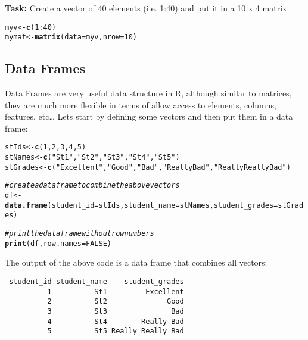 \documentclass{article}\usepackage[]{graphicx}\usepackage[]{color}
\makeatletter
\newcommand{\hlnum}[1]{\textcolor[rgb]{0.686,0.059,0.569}{#1}}%
\newcommand{\hlstr}[1]{\textcolor[rgb]{0.192,0.494,0.8}{#1}}%
\newcommand{\hlcom}[1]{\textcolor[rgb]{0.678,0.584,0.686}{\textit{#1}}}%
\newcommand{\hlopt}[1]{\textcolor[rgb]{0,0,0}{#1}}%
\newcommand{\hlstd}[1]{\textcolor[rgb]{0.345,0.345,0.345}{#1}}%
\newcommand{\hlkwb}[1]{\textcolor[rgb]{0.69,0.353,0.396}{#1}}%
\newcommand{\hlkwc}[1]{\textcolor[rgb]{0.333,0.667,0.333}{#1}}%
\newcommand{\hlkwd}[1]{\textcolor[rgb]{0.737,0.353,0.396}{\textbf{#1}}}%
\newenvironment{kframe}{%
 \def\at@end@of@kframe{}%
 \ifinner\ifhmode%
  \def\at@end@of@kframe{\end{minipage}}%
  \begin{minipage}{\columnwidth}%
 \fi\fi%
 \def\FrameCommand##1{\hskip\@totalleftmargin \hskip-\fboxsep
 \colorbox{shadecolor}{##1}\hskip-\fboxsep
     \hskip-\linewidth \hskip-\@totalleftmargin \hskip\columnwidth}%
 \MakeFramed {\advance\hsize-\width
   \@totalleftmargin\z@ \linewidth\hsize
   \@setminipage}}%
 {\par\unskip\endMakeFramed%
 \at@end@of@kframe}
\newenvironment{knitrout}{}{} %
\makeatother
\begin{document}
\textbf{Task:} Create a vector of 40 elements (i.e. 1:40) and put it in a 10 x 4 matrix
\begin{knitrout}
\color{fgcolor}\begin{kframe}
\begin{alltt}
\hlstd{myv} \hlkwb{<-} \hlkwd{c}\hlstd{(}\hlnum{1}\hlopt{:}\hlnum{40}\hlstd{)}
\hlstd{mymat} \hlkwb{<-} \hlkwd{matrix}\hlstd{(}\hlkwc{data}\hlstd{=myv,} \hlkwc{nrow}\hlstd{=}\hlnum{10}\hlstd{)}
\end{alltt}
\end{kframe}
\end{knitrout}

\subsection{Data Frames}

Data Frames are very useful data structure in R, although similar to matrices, they are much more flexible in terms of allow access to elements, columns, features, etc… Lets start by defining some vectors and then put them in a data frame: 

\begin{knitrout}
\color{fgcolor}\begin{kframe}
\begin{alltt}
\hlstd{stIds} \hlkwb{<-} \hlkwd{c}\hlstd{(}\hlnum{1}\hlstd{,}\hlnum{2}\hlstd{,}\hlnum{3}\hlstd{,}\hlnum{4}\hlstd{,}\hlnum{5}\hlstd{)}
\hlstd{stNames}\hlkwb{<-} \hlkwd{c}\hlstd{(}\hlstr{"St1"}\hlstd{,}\hlstr{"St2"}\hlstd{,}\hlstr{"St3"}\hlstd{,}\hlstr{"St4"}\hlstd{,}\hlstr{"St5"}\hlstd{)}
\hlstd{stGrades}\hlkwb{<-}\hlkwd{c}\hlstd{(}\hlstr{"Excellent"}\hlstd{,}\hlstr{"Good"}\hlstd{,}\hlstr{"Bad"}\hlstd{,}\hlstr{"Really Bad"}\hlstd{,}\hlstr{"Really Really Bad"}\hlstd{)}

\hlcom{# create a data frame to combine the above vectors }
\hlstd{df} \hlkwb{<-} \hlkwd{data.frame}\hlstd{(}\hlkwc{student_id}\hlstd{=stIds,}\hlkwc{student_name}\hlstd{=stNames,}\hlkwc{student_grades}\hlstd{=stGrades)}

\hlcom{# print the data frame without row numbers }
\hlkwd{print}\hlstd{(df,}\hlkwc{row.names} \hlstd{=} \hlnum{FALSE} \hlstd{)}
\end{alltt}
\end{kframe}
\end{knitrout}

The output of the above code is a data frame that combines all vectors: 
\begin{knitrout}
\color{fgcolor}\begin{kframe}
\begin{verbatim}
 student_id student_name    student_grades
          1          St1         Excellent
          2          St2              Good
          3          St3               Bad
          4          St4        Really Bad
          5          St5 Really Really Bad
\end{verbatim}
\end{kframe}
\end{knitrout}
\end{document}
